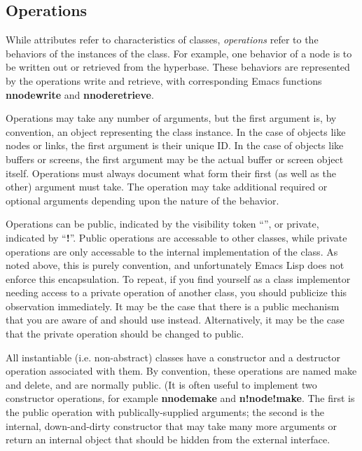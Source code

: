 \subsection{Operations}

While attributes refer to characteristics of classes, {\em operations}
refer to the behaviors of the instances of the class.  For example,
one behavior of a node is to be written out or retrieved from the
hyperbase.  These behaviors are represented by the operations
{\sf write} and {\sf retrieve}, with corresponding Emacs functions {\bf
n\STAR node\STAR write} and {\bf n\STAR node\STAR retrieve}.

Operations may take any number of arguments, but the first argument
is, by convention, an object representing the class instance.  In the
case of objects like nodes or links, the first argument is their
unique ID.  In the case of objects like buffers or screens, the first
argument may be the actual buffer or screen object itself.  Operations
must always document what form their first (as well as the other)
argument must take. The operation may take additional required or
optional arguments depending upon the nature of the behavior.


Operations can be public, indicated by the visibility token ``\STAR '',
or private, indicated by ``{\bf !}''.  Public operations are accessable to
other classes, while private operations are only accessable to the
internal implementation of the class. As noted above, this is purely
convention, and unfortunately Emacs Lisp does not enforce this
encapsulation.  To repeat, if you find yourself as a class implementor
needing access to a private operation of another class, you should
publicize this observation immediately.  It may be the case that there
is a public mechanism that you are aware of and should use instead.
Alternatively, it may be the case that the private operation should be
changed to public.

All instantiable (i.e. non-abstract) classes have a constructor and a
destructor operation associated with them.  By convention, these
operations are named {\sf make} and {\sf delete}, and are normally
public.  (It is often useful to implement two constructor operations,
for example {\bf n\STAR node\STAR make} and {\bf n!node!make}.  The first is
the public operation with publically-supplied arguments; the second is
the internal, down-and-dirty constructor that may take many more
arguments or return an internal object that should be hidden from the
external interface.

